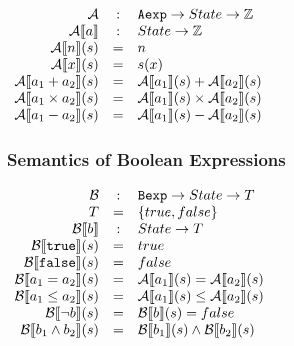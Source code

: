 \begin{math}
  \begin{array}{rcl}
    \mathcal{A} & : & \mathtt{Aexp} \to State \to \mathbb{Z} \\
    \mathcal{A} \llbracket  a  \rrbracket & : & State \to \mathbb{Z} \\
    \mathcal{A} \llbracket  n  \rrbracket (s) & = & n \\
    \mathcal{A} \llbracket  x  \rrbracket (s) & = & s(x) \\
    \mathcal{A} \llbracket  a_1 + a_2  \rrbracket (s) & = & \mathcal{A} \llbracket  a_1  \rrbracket (s) + \mathcal{A} \llbracket  a_2  \rrbracket (s) \\
    \mathcal{A} \llbracket  a_1 \times a_2  \rrbracket (s) & = & \mathcal{A} \llbracket  a_1  \rrbracket (s) \times \mathcal{A} \llbracket  a_2  \rrbracket (s) \\
    \mathcal{A} \llbracket  a_1 - a_2  \rrbracket (s) & = & \mathcal{A} \llbracket  a_1  \rrbracket (s) - \mathcal{A} \llbracket  a_2  \rrbracket (s) \\
  \end{array}
\end{math}

\subsubsection{Semantics of Boolean Expressions}

\begin{math}
  \begin{array}{rcl}
    \mathcal{B} & : & \mathtt{Bexp} \to State \to {T} \\
    {T} & = & \{ {true}, {false} \} \\
    \mathcal{B} \llbracket  b  \rrbracket & : & State \to {T} \\
    \mathcal{B} \llbracket  \mathtt{true}  \rrbracket (s) & = & {true} \\
    \mathcal{B} \llbracket  \mathtt{false}  \rrbracket (s) & = & {false} \\
    \mathcal{B} \llbracket  a_1 = a_2  \rrbracket (s) & = & \mathcal{A} \llbracket  a_1  \rrbracket (s) = \mathcal{A} \llbracket  a_2  \rrbracket (s) \\
    \mathcal{B} \llbracket  a_1 \leq a_2  \rrbracket (s) & = & \mathcal{A} \llbracket  a_1  \rrbracket (s) \leq \mathcal{A} \llbracket  a_2  \rrbracket (s) \\
    \mathcal{B} \llbracket  \neg b  \rrbracket (s) & = & \mathcal{B} \llbracket  b  \rrbracket (s) = {false} \\
    \mathcal{B} \llbracket  b_1 \land b_2  \rrbracket (s) & = & \mathcal{B} \llbracket  b_1  \rrbracket (s) \wedge \mathcal{B} \llbracket  b_2  \rrbracket (s) \\
  \end{array}
\end{math}

